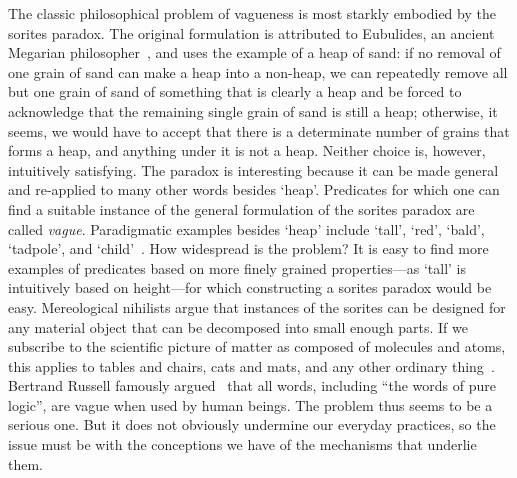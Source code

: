 \documentclass[a4paper]{article}
\begin{document}
The classic philosophical problem of vagueness is most starkly embodied by the sorites paradox.
The original formulation is attributed to Eubulides, an ancient Megarian philosopher~\parencite{sorensen_sorites_2009}, and uses the example of a heap of sand: if no removal of one grain of sand can make a heap into a non-heap, we can repeatedly remove all but one grain of sand of something that is clearly a heap and be forced to acknowledge that the remaining single grain of sand is still a heap; otherwise, it seems, we would have to accept that there is a determinate number of grains that forms a heap, and anything under it is not a heap.
Neither choice is, however, intuitively satisfying.
The paradox is interesting because it can be made general and re-applied to many other words besides `heap'.
Predicates for which one can find a suitable instance of the general formulation of the sorites paradox are called \emph{vague}.
Paradigmatic examples besides `heap' include `tall', `red', `bald', `tadpole', and `child'~\parencite{Keefe1997}.
How widespread is the problem?
It is easy to find more examples of predicates based on more finely grained properties---as `tall' is intuitively based on height---for which constructing a sorites paradox would be easy.
Mereological nihilists argue that instances of the sorites can be designed for any material object that can be decomposed into small enough parts.
If we subscribe to the scientific picture of matter as composed of molecules and atoms, this applies to tables and chairs, cats and mats, and any other ordinary thing~\parencite{Unger1979}.
Bertrand Russell famously argued~\parencite*{russell_vagueness_1923} that all words, including ``the words of pure logic'', are vague when used by human beings.
The problem thus seems to be a serious one.
But it does not obviously undermine our everyday practices, so the issue must be with the conceptions we have of the mechanisms that underlie them.
\end{document}
